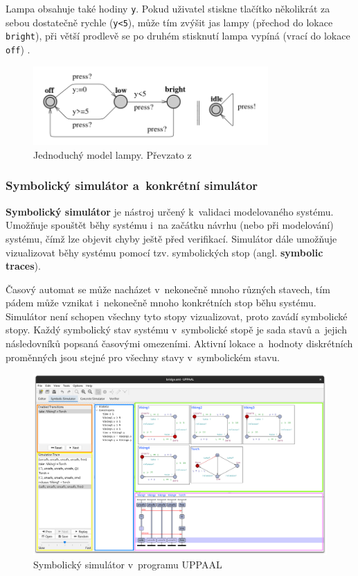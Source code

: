 Lampa obsahuje také hodiny \texttt{y}. Pokud uživatel stiskne tlačítko několikrát za sebou dostatečně rychle (\texttt{y<5}), může tím zvýšit jas lampy (přechod do lokace \texttt{bright}), při větší prodlevě se po druhém stisknutí lampa vypíná (vrací do lokace \texttt{off}) \cite{uppaal_intro}.

\begin{figure}[H]
    \centering
    \includegraphics[width=0.8\textwidth]{obrazky-figures/lamp_model.png}
    \caption{Jednoduchý model lampy. Převzato z~\cite{uppaal_intro}}
    \label{fig:lamp}
\end{figure}

\subsubsection{Symbolický simulátor a~konkrétní simulátor}
\textbf{Symbolický simulátor} je nástroj určený k~validaci modelovaného systému. Umožňuje spouštět běhy systému i~na začátku návrhu (nebo při modelování) systému, čímž lze objevit chyby ještě před verifikací. Simulátor dále umožňuje vizualizovat běhy systému pomocí tzv. symbolických stop (angl. \textbf{symbolic traces}).

Časový automat se může nacházet v~nekonečně mnoho různých stavech, tím pádem může vznikat i~nekonečně mnoho konkrétních stop běhu systému. Simulátor není schopen všechny tyto stopy vizualizovat, proto zavádí symbolické stopy. Každý symbolický stav systému v~symbolické stopě je sada stavů a~jejich následovníků popsaná časovými omezeními. Aktivní lokace a~hodnoty diskrétních proměnných jsou stejné pro všechny stavy v~symbolickém stavu.

\begin{figure}[H]
    \centering
    \includegraphics[width=\textwidth]{obrazky-figures/uppaal_symbsim.png}
    \caption{Symbolický simulátor v~programu UPPAAL}
    \label{fig:uppaal_symbsim}
\end{figure}

